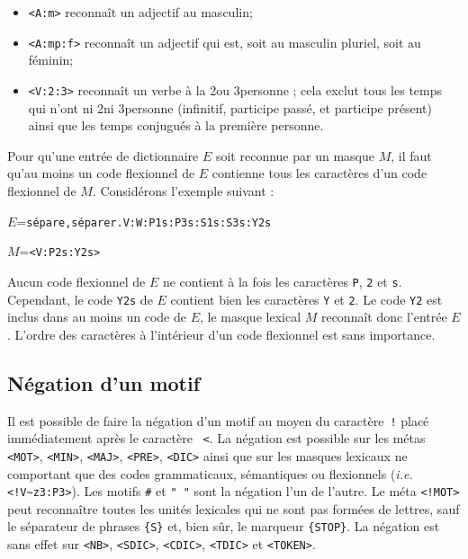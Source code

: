 \bigskip
\begin{itemize}
  \item \verb+<A:m>+ reconnaît un adjectif au masculin;
  \item \verb+<A:mp:f>+ reconnaît un adjectif qui est, soit au masculin pluriel, soit au féminin;
  \item \verb+<V:2:3>+ reconnaît un verbe à la 2\ieme ou 3\ieme personne ; cela exclut tous les
  temps qui n’ont ni 2\ieme ni 3\ieme personne (infinitif, participe passé, et participe présent)
  ainsi que les temps conjugués à la première personne.

\end{itemize}

\bigskip
\noindent Pour qu’une entrée de dictionnaire $E$ soit reconnue par un masque $M$, il faut qu’au
moins un code flexionnel de $E$ contienne tous les caractères d’un code flexionnel de $M$.
Considérons l’exemple suivant :

\bigskip
$E$=\verb$sépare,séparer.V:W:P1s:P3s:S1s:S3s:Y2s$

$M$=\verb$<V:P2s:Y2s>$

\bigskip
\noindent Aucun code flexionnel de $E$ ne contient à la fois les caractères \verb+P+, \verb+2+ et
\verb+s+. Cependant, le code \verb+Y2s+ de $E$ contient bien les caractères \verb+Y+ et \verb+2+. Le
code \verb+Y2+ est inclus dans au moins un code de $E$, le masque lexical $M$ reconnaît donc l’entrée $E$. L’ordre des caractères à l’intérieur d’un code flexionnel est sans importance.


\subsection{Négation d’un motif}
Il est possible de faire la négation d’un motif au moyen du caractère~\verb+!+ placé immédiatement
après le caractère ~\verb+<+. La négation est possible sur les métas \verb+<MOT>+, \verb+<MIN>+,
\verb+<MAJ>+, \verb+<PRE>+, \verb+<DIC>+  ainsi que sur les masques lexicaux ne comportant que des
codes grammaticaux, sémantiques ou flexionnels (\textit{i.e.} \verb$<!V~z3:P3>$). Les motifs
\verb+#+ et \verb+" "+  sont la négation l’un de l’autre.
\index{\verb+#+}
Le méta \verb$<!MOT>$ peut reconnaître toutes les unités lexicales qui ne sont pas formées de
lettres, sauf le séparateur de phrases \verb+{S}+ et, bien sûr, le marqueur \verb+{STOP}+.
La négation est sans effet sur \verb+<NB>+, \verb+<SDIC>+, \verb+<CDIC>+, \verb+<TDIC>+ et
\verb+<TOKEN>+.

